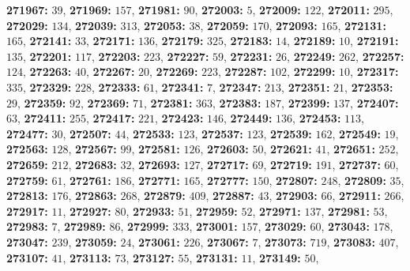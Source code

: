 \textsf{\bfseries 271967:} $39$, \textsf{\bfseries 271969:} $157$, \textsf{\bfseries 271981:} $90$, \textsf{\bfseries 272003:} $5$, \textsf{\bfseries 272009:} $122$, \textsf{\bfseries 272011:} $295$, \textsf{\bfseries 272029:} $134$, \textsf{\bfseries 272039:} $313$, \textsf{\bfseries 272053:} $38$, \textsf{\bfseries 272059:} $170$, \textsf{\bfseries 272093:} $165$, \textsf{\bfseries 272131:} $165$, \textsf{\bfseries 272141:} $33$, \textsf{\bfseries 272171:} $136$, \textsf{\bfseries 272179:} $325$, \textsf{\bfseries 272183:} $14$, \textsf{\bfseries 272189:} $10$, \textsf{\bfseries 272191:} $135$, \textsf{\bfseries 272201:} $117$, \textsf{\bfseries 272203:} $223$, \textsf{\bfseries 272227:} $59$, \textsf{\bfseries 272231:} $26$, \textsf{\bfseries 272249:} $262$, \textsf{\bfseries 272257:} $124$, \textsf{\bfseries 272263:} $40$, \textsf{\bfseries 272267:} $20$, \textsf{\bfseries 272269:} $223$, \textsf{\bfseries 272287:} $102$, \textsf{\bfseries 272299:} $10$, \textsf{\bfseries 272317:} $335$, \textsf{\bfseries 272329:} $228$, \textsf{\bfseries 272333:} $61$, \textsf{\bfseries 272341:} $7$, \textsf{\bfseries 272347:} $213$, \textsf{\bfseries 272351:} $21$, \textsf{\bfseries 272353:} $29$, \textsf{\bfseries 272359:} $92$, \textsf{\bfseries 272369:} $71$, \textsf{\bfseries 272381:} $363$, \textsf{\bfseries 272383:} $187$, \textsf{\bfseries 272399:} $137$, \textsf{\bfseries 272407:} $63$, \textsf{\bfseries 272411:} $255$, \textsf{\bfseries 272417:} $221$, \textsf{\bfseries 272423:} $146$, \textsf{\bfseries 272449:} $136$, \textsf{\bfseries 272453:} $113$, \textsf{\bfseries 272477:} $30$, \textsf{\bfseries 272507:} $44$, \textsf{\bfseries 272533:} $123$, \textsf{\bfseries 272537:} $123$, \textsf{\bfseries 272539:} $162$, \textsf{\bfseries 272549:} $19$, \textsf{\bfseries 272563:} $128$, \textsf{\bfseries 272567:} $99$, \textsf{\bfseries 272581:} $126$, \textsf{\bfseries 272603:} $50$, \textsf{\bfseries 272621:} $41$, \textsf{\bfseries 272651:} $252$, \textsf{\bfseries 272659:} $212$, \textsf{\bfseries 272683:} $32$, \textsf{\bfseries 272693:} $127$, \textsf{\bfseries 272717:} $69$, \textsf{\bfseries 272719:} $191$, \textsf{\bfseries 272737:} $60$, \textsf{\bfseries 272759:} $61$, \textsf{\bfseries 272761:} $186$, \textsf{\bfseries 272771:} $165$, \textsf{\bfseries 272777:} $150$, \textsf{\bfseries 272807:} $248$, \textsf{\bfseries 272809:} $35$, \textsf{\bfseries 272813:} $176$, \textsf{\bfseries 272863:} $268$, \textsf{\bfseries 272879:} $409$, \textsf{\bfseries 272887:} $43$, \textsf{\bfseries 272903:} $66$, \textsf{\bfseries 272911:} $266$, \textsf{\bfseries 272917:} $11$, \textsf{\bfseries 272927:} $80$, \textsf{\bfseries 272933:} $51$, \textsf{\bfseries 272959:} $52$, \textsf{\bfseries 272971:} $137$, \textsf{\bfseries 272981:} $53$, \textsf{\bfseries 272983:} $7$, \textsf{\bfseries 272989:} $86$, \textsf{\bfseries 272999:} $333$, \textsf{\bfseries 273001:} $157$, \textsf{\bfseries 273029:} $60$, \textsf{\bfseries 273043:} $178$, \textsf{\bfseries 273047:} $239$, \textsf{\bfseries 273059:} $24$, \textsf{\bfseries 273061:} $226$, \textsf{\bfseries 273067:} $7$, \textsf{\bfseries 273073:} $719$, \textsf{\bfseries 273083:} $407$, \textsf{\bfseries 273107:} $41$, \textsf{\bfseries 273113:} $73$, \textsf{\bfseries 273127:} $55$, \textsf{\bfseries 273131:} $11$, \textsf{\bfseries 273149:} $50$, 
